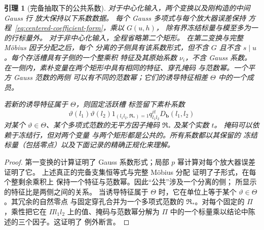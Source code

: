 \documentclass[11pt,a4paper]{article}
\numberwithin{equation}{section}
\numberwithin{figure}{section}
\newtheorem{lemma}[theorem]{引理}
\theoremstyle{definition}
\theoremstyle{remark}
\begin{document}
\begin{lemma}[完备抽取下的公共系数]
\label{lem:centered-coefficient-invariant}
对于中心化输入，两个变换以及刚构造的中间 Gauss 行
放大保持以下系数数据。
每个 Gauss 多项式与每个放大器误差保持
方程~\eqref{eq:centered-coefficient-form}，乘以 \(G(u,h)\)，
除有界冻结标量与模至多为一的行标量外。
对于非中心化输入，全程省略第二个矩形。
在第二变换与完整 M\"obius 因子分配之后，每个
分离的子侧具有该系数形式，但不含 \(G\) 且不含
\(s\mid u\)。每个存活槽具有子侧的一个整乘积
特征及其原始系数 \(\nu_i\)，不含 Gauss 系数。
在一侧内，素朴变量在两个矩形中具有相同的特征、穿孔掩码
与范数幂。一个平方 Gauss 范数的两侧
可以有不同的范数幂；它们的诱导特征相差
\(\Theta\) 中的一个成员。

若新的诱导特征属于 \(\Theta\)，则固定活跃槽
标签留下素朴系数
\[
 \vartheta(l_1)\vartheta(l_2)
 1_{(l_1l_2,\mathfrak R_*)=1}q_{l_1l_2}^{it}D_{\mathbf b}(l_1,l_2)
\]
对某个 \(\vartheta\in\Theta\)、某个多项式范数的无平方因子掩码
\(\mathfrak R_*\) 及某个实数 \(t\)。
掩码可以依赖于冻结行，但对两个变量
与两个矩形都是公共的。所有系数都以其保留的
冻结标量（包括零点）以及下面记录的精确正规化来理解。
\end{lemma}

\begin{proof}
第一变换的计算证明了 Gauss 系数形式；局部
\(p\) 幂计算对每个放大器误差证明了它。
上述真正的完备支集恒等式与完整 M\"obius 分配
证明了子形式，在每个整剩余乘积上
保持一个特征与范数幂。因此“公共”涉及一个分离的侧；
所显示的特征比是两侧之间的关系。
当诱导特征属于 \(\Theta\) 时，它在单位上等于某个
\(\vartheta\in\Theta\)。其冗余的自然零点
与固定穿孔合并为一个多项式范数的
\(\mathfrak R_*\)。对每个固定的 \(\Pi\)，乘性把它在
\(\Pi l_1l_2\) 上的值、掩码与范数幂分解为 \(\Pi\)
中的一个标量乘以结论中陈述的三个因子。这证明了
例外断言。
\end{proof}
\end{document}

